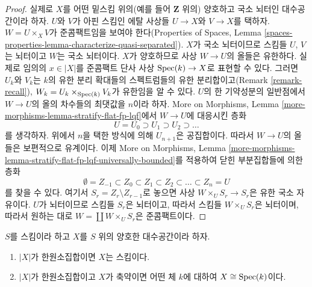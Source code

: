 \begin{proof}
실제로 $X$를 어떤 밑스킴 위의(예를 들어 $\mathbf{Z}$ 위의) 양호하고
국소 뇌터인 대수공간이라 하자. $U$와 $V$가 아핀 스킴인 에탈 사상들
$U \to X$와 $V \to X$를 택하자. $W = U \times_X V$가 준콤팩트임을
보여야 한다(Properties of Spaces, Lemma
\ref{spaces-properties-lemma-characterize-quasi-separated}).
$X$가 국소 뇌터이므로 스킴들 $U$, $V$는 뇌터이고 $W$는 국소
뇌터이다. $X$가 양호하므로 사상 $W \to U$의 올들은 유한하다.
실제로 임의의 $x \in |X|$를 준콤팩트 단사 사상
$\mathop{\mathrm{Spec}}(k) \to X$로 표현할 수 있다. 그러면 $U_k$와 $V_k$는 $k$의
유한 분리 확대들의 스펙트럼들의 유한 분리합이고(Remark
\ref{remark-recall}),
$W_k = U_k \times_{\mathop{\mathrm{Spec}}(k)} V_k$가 유한임을 알 수 있다. $U$의 한
기약성분의 일반점에서 $W \to U$의 올의 차수들의 최댓값을 $n$이라
하자. More on Morphisms, Lemma
\ref{more-morphisms-lemma-stratify-flat-fp-lqf}에서 $W \to U$에 대응시킨
층화
$$
U = U_0 \supset U_1 \supset U_2 \supset \ldots
$$
를 생각하자. 위에서 $n$을 택한 방식에 의해 $U_{n + 1}$은 공집합이다.
따라서 $W \to U$의 올들은 보편적으로 유계이다. 이제 More on
Morphisms, Lemma
\ref{more-morphisms-lemma-stratify-flat-fp-lqf-universally-bounded}를
적용하여 닫힌 부분집합들에 의한 층화
$$
\emptyset = Z_{-1} \subset Z_0 \subset Z_1 \subset Z_2 \subset
\ldots \subset Z_n = U
$$
를 찾을 수 있다. 여기서 $S_r = Z_r \setminus Z_{r - 1}$로 놓으면
사상 $W \times_U S_r \to S_r$은 유한 국소 자유이다. $U$가
뇌터이므로 스킴들 $S_r$은 뇌터이고, 따라서 스킴들
$W \times_U S_r$은 뇌터이며, 따라서 원하는 대로
$W = \coprod W \times_U S_r$은 준콤팩트이다.
\end{proof}

\begin{lemma}
\label{lemma-when-field}
$S$를 스킴이라 하고 $X$를 $S$ 위의 양호한 대수공간이라 하자.
\begin{enumerate}
\item $|X|$가 한원소집합이면 $X$는 스킴이다.
\item $|X|$가 한원소집합이고 $X$가 축약이면 어떤 체 $k$에 대하여
$X \cong \mathop{\mathrm{Spec}}(k)$이다.
\end{enumerate}
\end{lemma}

